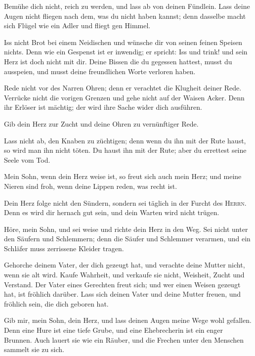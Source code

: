  Bemühe dich nicht, reich zu werden, und lass ab von
deinen Fündlein.  Lass deine Augen nicht fliegen nach dem,
was du nicht haben kannst; denn dasselbe macht sich Flügel wie ein Adler
und fliegt gen Himmel.

 Iss nicht Brot bei einem Neidischen und wünsche dir von
seinen feinen Speisen nichts.  Denn wie ein Gespenst ist
er inwendig; er spricht: Iss und trink! und sein Herz ist doch nicht mit
dir.  Deine Bissen die du gegessen hattest, musst du
ausspeien, und musst deine freundlichen Worte verloren haben.

 Rede nicht vor des Narren Ohren; denn er verachtet die
Klugheit deiner Rede.  Verrücke nicht die vorigen Grenzen
und gehe nicht auf der Waisen Acker.  Denn ihr Erlöser
ist mächtig; der wird ihre Sache wider dich ausführen.

 Gib dein Herz zur Zucht und deine Ohren zu vernünftiger
Rede.

 Lass nicht ab, den Knaben zu züchtigen; denn wenn du ihn
mit der Rute haust, so wird man ihn nicht töten.  Du
haust ihn mit der Rute; aber du errettest seine Seele vom Tod.

 Mein Sohn, wenn dein Herz weise ist, so freut sich auch
mein Herz;  und meine Nieren sind froh, wenn deine Lippen
reden, was recht ist.

 Dein Herz folge nicht den Sündern, sondern sei täglich
in der Furcht des \textsc{Herrn}.  Denn es wird dir
hernach gut sein, und dein Warten wird nicht trügen.

 Höre, mein Sohn, und sei weise und richte dein Herz in
den Weg.  Sei nicht unter den Säufern und Schlemmern;
 denn die Säufer und Schlemmer verarmen, und ein Schläfer
muss zerrissene Kleider tragen.

 Gehorche deinem Vater, der dich gezeugt hat, und
verachte deine Mutter nicht, wenn sie alt wird.  Kaufe
Wahrheit, und verkaufe sie nicht, Weisheit, Zucht und Verstand.
 Der Vater eines Gerechten freut sich; und wer einen
Weisen gezeugt hat, ist fröhlich darüber.  Lass sich
deinen Vater und deine Mutter freuen, und fröhlich sein, die dich
geboren hat.

 Gib mir, mein Sohn, dein Herz, und lass deinen Augen
meine Wege wohl gefallen.  Denn eine Hure ist eine tiefe
Grube, und eine Ehebrecherin ist ein enger Brunnen.  Auch
lauert sie wie ein Räuber, und die Frechen unter den Menschen sammelt
sie zu sich.


